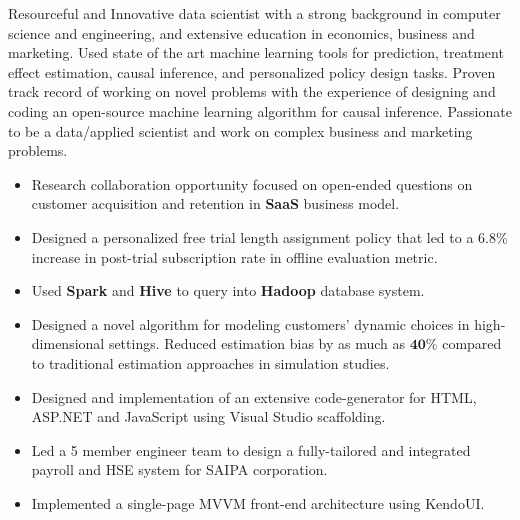 \documentclass[10pt,a4paper,ragged2e,withhyper]{files/altacv}
\begin{document}
\begin{paracol}{2}
Resourceful and Innovative data scientist with a strong background in computer science and engineering, and extensive education in economics, business and marketing. Used state of the art machine learning tools for prediction, treatment effect estimation, causal inference, and personalized policy design tasks. Proven track record of working on novel problems with the experience of designing and coding an open-source machine learning algorithm for causal inference. Passionate to be a data/applied scientist and work on complex business and marketing problems.


\begin{itemize}
\item Research collaboration opportunity focused on open-ended questions on customer acquisition and retention in \textbf{SaaS} business model.
\item Designed a personalized free trial length assignment policy that led to a $\mathbf{6.8\%}$ increase in post-trial subscription rate in offline evaluation metric.
\item Used \textbf{Spark} and \textbf{Hive} to query into \textbf{Hadoop} database system.
\item Designed a novel algorithm for modeling customers' dynamic choices in high-dimensional settings. Reduced estimation bias by as much as $\mathbf{40\%}$ compared to traditional estimation approaches in simulation studies.
\end{itemize}

\divider

\begin{itemize}
\item Designed and implementation of an extensive code-generator for HTML, ASP.NET and JavaScript using Visual Studio scaffolding.
\item Led a 5 member engineer team to design a fully-tailored and integrated payroll and HSE system for SAIPA corporation.
\item Implemented a single-page MVVM front-end architecture using KendoUI.
\end{itemize}


\end{paracol}
\end{document}

